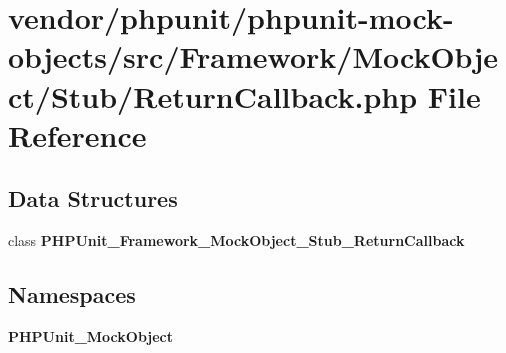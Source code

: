 \section{vendor/phpunit/phpunit-\/mock-\/objects/src/\+Framework/\+Mock\+Object/\+Stub/\+Return\+Callback.php File Reference}
\label{_return_callback_8php}
\subsection*{Data Structures}
\begin{DoxyCompactItemize}
\item 
class {\bf P\+H\+P\+Unit\+\_\+\+Framework\+\_\+\+Mock\+Object\+\_\+\+Stub\+\_\+\+Return\+Callback}
\end{DoxyCompactItemize}
\subsection*{Namespaces}
\begin{DoxyCompactItemize}
\item 
 {\bf P\+H\+P\+Unit\+\_\+\+Mock\+Object}
\end{DoxyCompactItemize}

